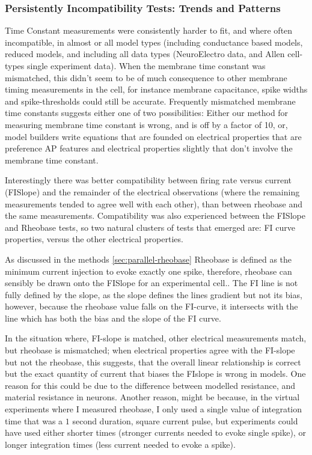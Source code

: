 

\subsubsection{Persistently Incompatibility Tests: Trends and Patterns}

Time Constant measurements were consistently harder to fit, and where often incompatible, in almost or all model types (including conductance based models, reduced models, and including all data types (NeuroElectro data, and Allen cell-types single experiment data). When the membrane time constant was mismatched, this didn't seem to be of much consequence to other membrane timing measurements in the cell, for instance membrane capacitance, spike widths and spike-thresholds could still be accurate. Frequently mismatched membrane time constants suggests either one of two possibilities: Either our method for measuring membrane time constant is wrong, and is off by a factor of 10, or, model builders write equations that are founded on electrical properties that are preference AP features and electrical properties slightly that don't involve the membrane time constant.

Interestingly there was better compatibility between firing rate versus current (FISlope) and the remainder of the electrical observations (where the remaining measurements tended to agree well with each other), than between rheobase and the same measurements. Compatibility was also experienced between the FISlope and Rheobase tests, so two natural clusters of tests that emerged are: FI curve properties, versus the other electrical properties.

As discussed in the methods \ref{sec:parallel-rheobase} Rheobase is defined as the minimum current injection to evoke exactly one spike, therefore, rheobase can sensibly be drawn onto the FISlope for an experimental cell.. The FI line is not fully defined by the slope, as the slope defines the lines gradient but not its bias, however, because the rheobase value falls on the FI-curve, it intersects with the line which has both the bias and the slope of the FI curve. 

In the situation where, FI-slope is matched, other electrical measurements match, but rheobase is mismatched; when electrical properties agree with the FI-slope but not the rheobase, this suggests, that the overall linear relationship is correct but the exact quantity of current that biases the FIslope is wrong in models. One reason for this could be due to the difference between modelled resistance, and material resistance in neurons. Another reason, might be because, in the virtual experiments where I measured rheobase, I only used a single value of integration time that was a $1$ second duration,  square current pulse, but experiments could have used either shorter times (stronger currents needed to evoke single spike), or longer integration times (less current needed to evoke a spike).


